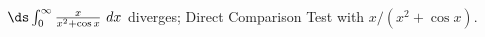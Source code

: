 {$\ds \int_{0}^\infty \frac{x}{x^2+\cos x} \ dx$}
{diverges; Direct Comparison Test with $x/(x^2+\cos x)$.}
